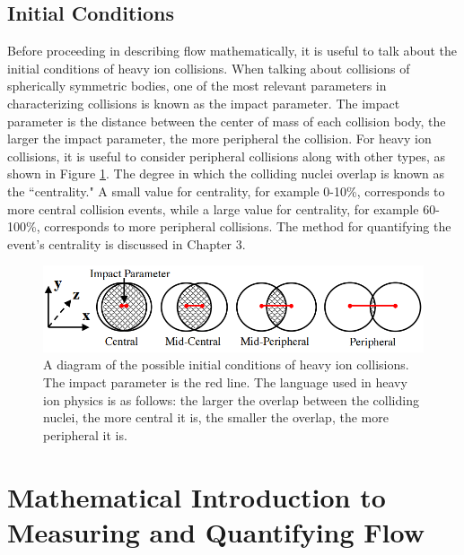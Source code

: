 \subsection{Initial Conditions}
Before proceeding in describing flow mathematically, it is useful to talk about the initial conditions of heavy ion collisions. When talking about collisions of spherically symmetric bodies, one of the most relevant parameters in characterizing collisions is known as the impact parameter. The impact parameter is the distance between the center of mass of each collision body, the larger the impact parameter, the more peripheral the collision. For heavy ion collisions, it is useful to consider peripheral collisions along with other types, as shown in Figure \ref{fig:centrality_diagram}. The degree in which the colliding nuclei overlap is known as the ``centrality." A small value for centrality, for example 0-10\%, corresponds to more central collision events, while a large value for centrality, for example 60-100\%, corresponds to more peripheral collisions. The method for quantifying the event's centrality is discussed in Chapter 3.
\begin{figure}[!ht]
\begin{center}
\includegraphics[width=0.55\linewidth]{figs/centrality_impact_parameter_diagram.PNG}
\caption{A diagram of the possible initial conditions of heavy ion collisions. The impact parameter is the red line. The language used in heavy ion physics is as follows: the larger the overlap between the colliding nuclei, the more central it is, the smaller the overlap, the more peripheral it is.}
\label{fig:centrality_diagram}
\end{center}
\end{figure}



\section{Mathematical Introduction to Measuring and Quantifying Flow}

